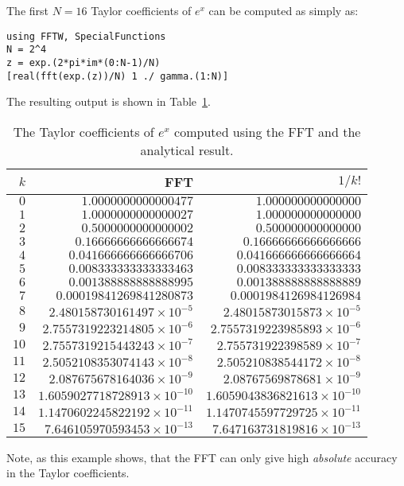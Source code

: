 \begin{example}
The first $N=16$ Taylor coefficients of $e^x$ can be computed as simply as:
\begin{verbatim}
using FFTW, SpecialFunctions
N = 2^4
z = exp.(2*pi*im*(0:N-1)/N)
[real(fft(exp.(z))/N) 1 ./ gamma.(1:N)]
\end{verbatim}
The resulting output is shown in Table~\ref{table:TaylorExponential}.
\begin{table}[htp]
\caption{The Taylor coefficients of $e^x$ computed using the FFT and the analytical result.}
\begin{center}
\begin{tabular}{rrr}
\hline
$k$ & FFT & $1/k!$\\
\hline
$0$ & $1.0000000000000477$ & $1.000000000000000$\\
$1$ & $1.0000000000000027$ & $1.000000000000000$\\
$2$ & $0.5000000000000002$ & $0.500000000000000$\\
$3$ & $0.16666666666666674$ & $0.16666666666666666$\\
$4$ & $0.041666666666666706$ & $0.041666666666666664$\\
$5$ & $0.008333333333333463$ & $0.008333333333333333$\\
$6$ & $0.001388888888888995$ & $0.001388888888888889$\\
$7$ & $0.00019841269841280873$ & $0.0001984126984126984$\\
$8$ & $2.480158730161497\times10^{-5}$ & $2.48015873015873\times10^{-5}$\\
$9$ & $2.7557319223214805\times10^{-6}$ & $2.7557319223985893\times10^{-6}$\\
$10$ & $2.7557319215443243\times10^{-7}$ & $2.755731922398589\times10^{-7}$\\
$11$ & $2.5052108353074143\times10^{-8}$ & $2.505210838544172\times10^{-8}$\\
$12$ & $2.087675678164036\times10^{-9}$ & $2.08767569878681\times10^{-9}$\\
$13$ & $1.6059027718728913\times10^{-10}$ & $1.6059043836821613\times10^{-10}$\\
$14$ & $1.1470602245822192\times10^{-11}$ & $1.1470745597729725\times10^{-11}$\\
$15$ & $7.646105970593453\times10^{-13}$ & $7.647163731819816\times10^{-13}$\\
\hline
\end{tabular}
\end{center}
\label{table:TaylorExponential}
\end{table}%
Note, as this example shows, that the FFT can only give high {\em absolute} accuracy in the Taylor coefficients.
\end{example}

